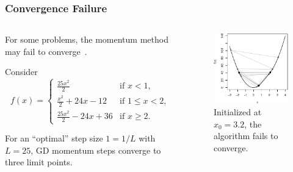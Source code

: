 \documentclass[aspectratio=1610,onlytextwidth]{beamer}
\begin{document}
\begin{frame}[c]
  \frametitle{Convergence Failure}

  \begin{columns}
    \begin{column}{0.45\textwidth}
      For some problems, the momentum method may fail to
      converge~\parencite{lessardAnalysisDesignOptimization2016}.

      \pause

      \bigskip

      Consider
      \[
        f(x) =
        \begin{cases}
          \frac{25x^2}{2}            & \text{if } x < 1,        \\
          \frac{x^2}{2} +24x - 12    & \text{if } 1 \leq x < 2, \\
          \frac{25x^2}{2} - 24x + 36 & \text{if } x \geq 2.
        \end{cases}
      \]

      \pause
      \bigskip

      For an ``optimal'' step size $1 = 1/ L$ with $L = 25$, GD
      momentum steps converge to three limit points.

    \end{column}
    \begin{column}{0.45\textwidth}
      \begin{figure}[htpb]
        \centering
        \includegraphics[]{images/momentum-failure.pdf}
        \caption{%
          Initialized at $x_0 = 3.2$, the algorithm fails to converge.
        }
      \end{figure}
    \end{column}
  \end{columns}
\end{frame}
\end{document}
